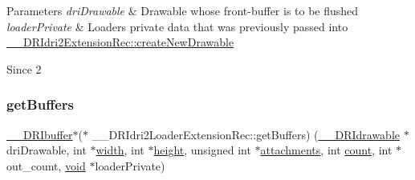 \begin{DoxyParams}{Parameters}
{\em dri\+Drawable} & Drawable whose front-\/buffer is to be flushed \\
\hline
{\em loader\+Private} & Loader\textquotesingle{}s private data that was previously passed into \hyperlink{struct_____d_r_idri2_extension_rec_a8ab2424cbe4598219f503e9e7dad2d04}{\+\_\+\+\_\+\+D\+R\+Idri2\+Extension\+Rec\+::create\+New\+Drawable}\\
\hline
\end{DoxyParams}
\begin{DoxySince}{Since}
2 
\end{DoxySince}
\mbox{\label{struct_____d_r_idri2_loader_extension_rec_a9f030fcd471a25644439feb5e963e35a}} 
\subsubsection{\texorpdfstring{get\+Buffers}{getBuffers}}
{\footnotesize\ttfamily \hyperlink{dri__interface_8h_a99ccb036a4865817ec4d06d153ba2446}{\+\_\+\+\_\+\+D\+R\+Ibuffer}$\ast$($\ast$ \+\_\+\+\_\+\+D\+R\+Idri2\+Loader\+Extension\+Rec\+::get\+Buffers) (\hyperlink{dri__interface_8h_a5bfb832a0a08208d95b3bbef439d2262}{\+\_\+\+\_\+\+D\+R\+Idrawable} $\ast$dri\+Drawable, int $\ast$\hyperlink{gl_8h_a9a82cf3caff84cabc4598e2619faac17}{width}, int $\ast$\hyperlink{gl_8h_aa352f2804b9902ac30769c00dde75d5f}{height}, unsigned int $\ast$\hyperlink{glcorearb_8h_ab1774e5671b09a9cc14614868cc6a9b9}{attachments}, int \hyperlink{gl_8h_a619bc20e8198de3bd3f3d7fc34de66b2}{count}, int $\ast$out\+\_\+count, \hyperlink{_s_d_l__opengles2__gl2ext_8h_ae5d8fa23ad07c48bb609509eae494c95}{void} $\ast$loader\+Private)}

\mbox{\label{struct_____d_r_idri2_loader_extension_rec_ad26fa15ad8b8c73ccfb87e9c9a085ca0}} 
